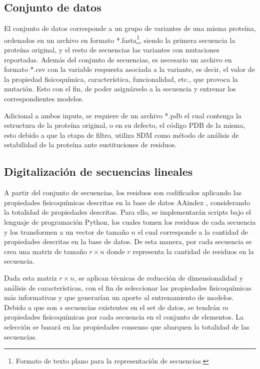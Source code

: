 \subsection{Conjunto de datos}

El conjunto de datos corresponde a un grupo de variantes de una misma proteína, ordenados en un archivo en formato *.fasta\footnote{Formato de texto plano para la representación de secuencias.}, siendo la primera secuencia la proteína original, y el resto de secuencias las variantes con mutaciones reportadas. Además del conjunto de secuencias, es necesario un archivo en formato *.csv con la variable respuesta asociada a la variante, es decir, el valor de la propiedad fisicoquímica, característica, funcionalidad, etc., que provoca la mutación. Esto con el fin, de poder asignárselo a la secuencia y entrenar los correspondientes modelos. 

Adicional a ambos inputs, se requiere de un archivo *.pdb el cual contenga la estructura de la proteína original, o en su defecto, el código PDB de la misma, esto debido a que la etapa de filtro, utiliza SDM como método de análisis de estabilidad de la proteína ante sustituciones de residuos.

\subsection{Digitalización de secuencias lineales}

A partir del conjunto de secuencias, los residuos son codificados aplicando las propiedades fisicoquímicas descritas en la base de datos AAindex \cite{Kawashima2000}, considerando la totalidad de propiedades descritas. Para ello, se implementarán scripts bajo el lenguaje de programación Python, los cuales tomen los residuos de cada secuencia y los transformen a un vector de tamaño $n$ el cual corresponde a la cantidad de propiedades descritas en la base de datos. De esta manera, por cada secuencia se crea una matriz de tamaño $r \times n$ donde $r$ representa la cantidad de residuos en la secuencia.

Dada esta matriz $r \times n$, se aplican técnicas de reducción de dimensionalidad y análisis de características, con el fin de seleccionar las propiedades fisicoquímicas más informativas y que generarían un aporte al entrenamiento de modelos. Debido a que son $s$ secuencias existentes en el set de datos, se tendrán $m$ propiedades fisicoquímicas por cada secuencia en el conjunto de elementos. La selección se basará en las propiedades consenso que abarquen la totalidad de las secuencias. 

